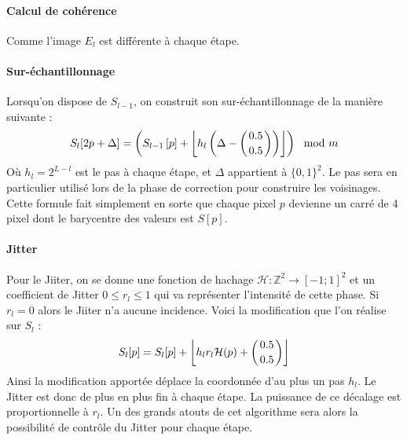 \documentclass[12pt]{article}
\newcommand{\Z}{\mathbb{Z}}
\begin{document}
\paragraph{Calcul de cohérence}

Comme l'image $E_l$ est différente à chaque étape.

\paragraph{Sur-échantillonnage}
Lorsqu'on dispose de $S_{l-1}$, on construit son sur-échantillonnage de la manière suivante :
$$ S_l [2p + \Delta] = \left( S_{l-1} \left[ p \right] + \left\lfloor h_l \left( \Delta - \left( 0.5 \atop 0.5 \right) \right) \right\rfloor \right) \mod m $$
Où $h_l = 2^{L-l}$ est le pas à chaque étape, et $\Delta$ appartient à $\{ 0, 1 \}^2$. Le pas sera en particulier utilisé lors de la phase de correction pour construire les voisinages. Cette formule fait simplement en sorte que chaque pixel $p$ devienne un carré de 4 pixel dont le barycentre des valeurs est $S[p]$.

\paragraph{Jitter}
Pour le Jiiter, on se donne une fonction de hachage $\mathcal{H} : \Z^2 \rightarrow [ -1; 1 ]^2$ et un coefficient de Jitter $0 \leqslant r_l \leqslant 1$ qui va représenter l'intensité de cette phase. Si $r_l = 0$ alors le Jiiter n'a aucune incidence. Voici la modification que l'on réalise sur $S_l$ :
$$ S_l[p] = S_l[p] + \left\lfloor h_l r_l \mathcal{H}(p) + \left( 0.5 \atop 0.5 \right) \right\rfloor $$
Ainsi la modification apportée déplace la coordonnée d'au plus un pas $h_l$. Le Jitter est donc de plus en plus fin à chaque étape. La puissance de ce décalage est proportionnelle à $r_l$. Un des grands atouts de cet algorithme sera alors la possibilité de contrôle du Jitter pour chaque étape.
\end{document}
